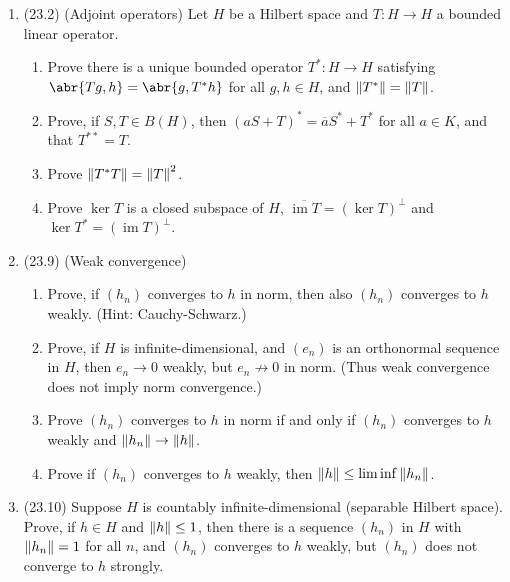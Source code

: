 \documentclass[11pt]{article}
\DeclareMathOperator{\im}{im}
\begin{document}
\begin{enumerate}
    \item (23.2) (Adjoint operators) Let $H$ be a Hilbert space and $T\colon H\to H$ a bounded linear operator. \begin{enumerate}
      \item Prove there is a unique bounded operator $T^\ast\colon H\to H$ satisfying $\abr{Tg,h}= \abr{g,T^\ast h}$ for all $g,h\in H$, and $\norm{T^\ast} = \norm{T}$.
      \item Prove, if $S,T\in B(H)$, then $(aS+T)^\ast = \overline{a}S^\ast + T^\ast$ for all $a\in K$, and that $T^{\ast\ast} = T$.
      \item Prove $\norm{T^\ast T} = \norm{T}^2$.
      \item Prove $\ker T$ is a closed subspace of $H$, $\overline{\im T} = (\ker T)^\perp$ and $\ker T^\ast = (\im T)^\perp$.
    \end{enumerate}
    \item (23.9) (Weak convergence) \begin{enumerate}
      \item Prove, if $(h_n)$ converges to $h$ in norm, then also $(h_n)$ converges to $h$ weakly. (Hint: Cauchy-Schwarz.)
      \item Prove, if $H$ is infinite-dimensional, and $(e_n)$ is an orthonormal sequence in $H$, then $e_n\to 0$ weakly, but $e_n\not\to 0$ in norm. (Thus weak convergence does not imply norm convergence.)
      \item Prove $(h_n)$ converges to $h$ in norm if and only if $(h_n)$ converges to $h$ weakly and $\norm{h_n}\to \norm{h}$.
      \item Prove if $(h_n)$ converges to $h$ weakly, then $\norm{h}\leq \liminf\norm{h_n}$.
    \end{enumerate}
    \item (23.10) Suppose $H$ is countably infinite-dimensional (separable Hilbert space). Prove, if $h\in H$ and $\norm{h}\leq 1$, then there is a sequence $(h_n)$ in $H$ with $\norm{h_n}=1$ for all $n$, and $(h_n)$ converges to $h$ weakly, but $(h_n)$ does not converge to $h$ strongly.
\end{enumerate}
\end{document}
